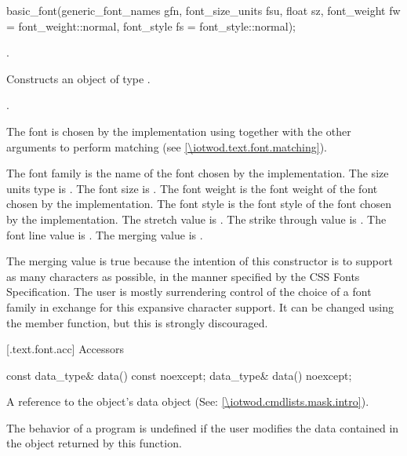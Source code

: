 %
\begin{itemdecl}
basic_font(generic_font_names gfn, font_size_units fsu, float sz, 
  font_weight fw = font_weight::normal, font_style fs = font_style::normal);
\end{itemdecl}
\begin{itemdescr}
\pnum
\requires {}.

\pnum
\effects Constructs an object of type .

\pnum
\postconditions {}.

\pnum
\remarks The font is chosen by the implementation using  together with the other arguments to perform matching (see \ref{\iotwod.text.font.matching}).

\pnum The font family is the name of the font chosen by the implementation. The size units type is . The font size is . The font weight is the font weight of the font chosen by the implementation. The font style is the font style of the font chosen by the implementation. The stretch value is . The strike through value is . The font line value is . The merging value is .

\pnum
\begin{note}
The merging value is true because the intention of this constructor is to support as many characters as possible, in the manner specified by the CSS Fonts Specification. The user is mostly surrendering control of the choice of a font family in exchange for this expansive character support. It can be changed using the  member function, but this is strongly discouraged.
\end{note}
\end{itemdescr}

 [\iotwod.text.font.acc] {Accessors}%

%
\begin{itemdecl}
const data_type& data() const noexcept;
data_type& data() noexcept;
\end{itemdecl}
\begin{itemdescr}
\pnum
\returns A reference to the  object's data object (See: \ref{\iotwod.cmdlists.mask.intro}).

\pnum
\remarks The behavior of a program is undefined if the user modifies the data contained in the  object returned by this function.
\end{itemdescr}

